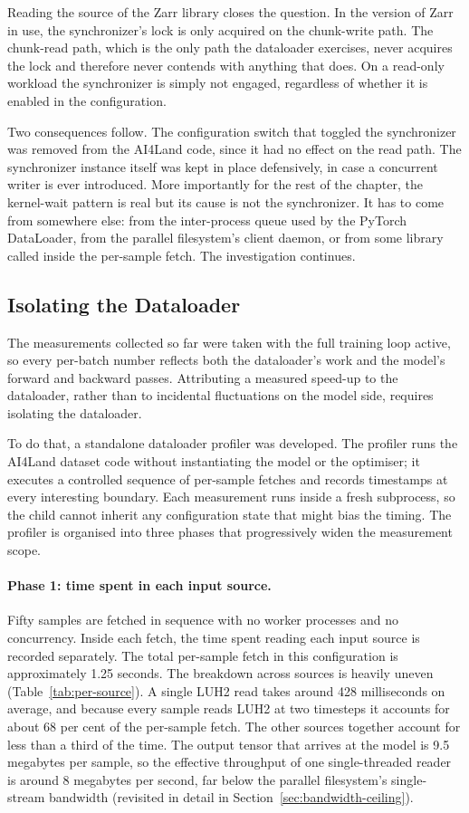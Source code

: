 \documentclass[12pt,a4paper]{article}
\begin{document}
Reading the source of the Zarr library closes the question. In the version of Zarr in use,
the synchronizer's lock is only acquired on the chunk-write path. The chunk-read path,
which is the only path the dataloader exercises, never acquires the lock and therefore
never contends with anything that does. On a read-only workload the synchronizer is simply
not engaged, regardless of whether it is enabled in the configuration.

Two consequences follow. The configuration switch that toggled the synchronizer was removed
from the AI4Land code, since it had no effect on the read path. The synchronizer instance
itself was kept in place defensively, in case a concurrent writer is ever introduced. More
importantly for the rest of the chapter, the kernel-wait pattern is real but its cause is
not the synchronizer. It has to come from somewhere else: from the inter-process queue
used by the PyTorch DataLoader, from the parallel filesystem's client daemon, or from some
library called inside the per-sample fetch. The investigation continues.

\subsection{Isolating the Dataloader}

The measurements collected so far were taken with the full training loop active, so every
per-batch number reflects both the dataloader's work and the model's forward and backward
passes. Attributing a measured speed-up to the dataloader, rather than to incidental
fluctuations on the model side, requires isolating the dataloader.

To do that, a standalone dataloader profiler was developed. The profiler runs the AI4Land
dataset code without instantiating the model or the optimiser; it executes a controlled
sequence of per-sample fetches and records timestamps at every interesting boundary. Each
measurement runs inside a fresh subprocess, so the child cannot inherit any configuration
state that might bias the timing. The profiler is organised into three phases that
progressively widen the measurement scope.

\paragraph{Phase 1: time spent in each input source.} Fifty samples are fetched in sequence
with no worker processes and no concurrency. Inside each fetch, the time spent reading each
input source is recorded separately. The total per-sample fetch in this configuration is
approximately 1.25 seconds. The breakdown across sources is heavily uneven
(Table~\ref{tab:per-source}). A single LUH2 read takes around 428 milliseconds on average,
and because every sample reads LUH2 at two timesteps it accounts for about 68 per cent of
the per-sample fetch. The other sources together account for less than a third of the time. The output tensor that arrives at the model is 9.5 megabytes per sample, so the
effective throughput of one single-threaded reader is around 8 megabytes per second, far
below the parallel filesystem's single-stream bandwidth (revisited in detail in
Section~\ref{sec:bandwidth-ceiling}).
\end{document}
